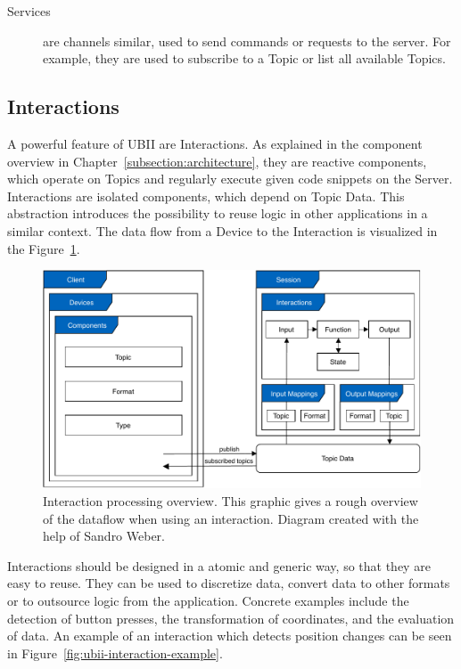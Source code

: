 \begin{description}
	\item[Services] are channels similar, used to send commands or requests to the server. For example, they are used to subscribe to a Topic or list all available Topics.
\end{description}


\subsection{Interactions}\label{subsection:interactions}
A powerful feature of \ac{UBII} are Interactions. As explained in the component overview in Chapter~\ref{subsection:architecture}, they are reactive components, which operate on Topics and regularly execute given code snippets on the Server. Interactions are isolated components, which depend on Topic Data. This abstraction introduces the possibility to reuse logic in other applications in a similar context. The data flow from a Device to the Interaction is visualized in the Figure~\ref{fig:ubii-cd}.

\begin{figure}[H]
  \centering
  \includegraphics[width=12cm]{figures/implementation/ubii_cd.pdf}
  \caption[UBII communication diagram]{Interaction processing overview. This graphic gives a rough overview of the dataflow when using an interaction. Diagram created with the help of Sandro Weber.}\label{fig:ubii-cd}
\end{figure}

Interactions should be designed in a atomic and generic way, so that they are easy to reuse. They can be used to discretize data, convert data to other formats or to outsource logic from the application. Concrete examples include the detection of button presses, the transformation of coordinates, and the evaluation of data. An example of an interaction which detects position changes can be seen in Figure~\ref{fig:ubii-interaction-example}.

